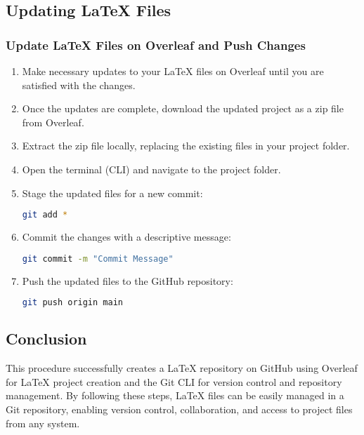 \subsection{Updating LaTeX Files}
\subsubsection{Update LaTeX Files on Overleaf and Push Changes}

\begin{enumerate}
    \item Make necessary updates to your LaTeX files on Overleaf until you are satisfied with the changes.
    \item Once the updates are complete, download the updated project as a zip file from Overleaf.
    \item Extract the zip file locally, replacing the existing files in your project folder.
    \item Open the terminal (CLI) and navigate to the project folder.
    \item Stage the updated files for a new commit:
    \begin{lstlisting}[language=bash]
    git add *
    \end{lstlisting}
    \item Commit the changes with a descriptive message:
    \begin{lstlisting}[language=bash]
    git commit -m "Commit Message"
    \end{lstlisting}
    \item Push the updated files to the GitHub repository:
    \begin{lstlisting}[language=bash]
    git push origin main
    \end{lstlisting}
\end{enumerate}


\subsection{Conclusion}
This procedure successfully creates a LaTeX repository on GitHub using Overleaf for LaTeX project creation and the Git CLI for version control and repository management. By following these steps, LaTeX files can be easily managed in a Git repository, enabling version control, collaboration, and access to project files from any system.

